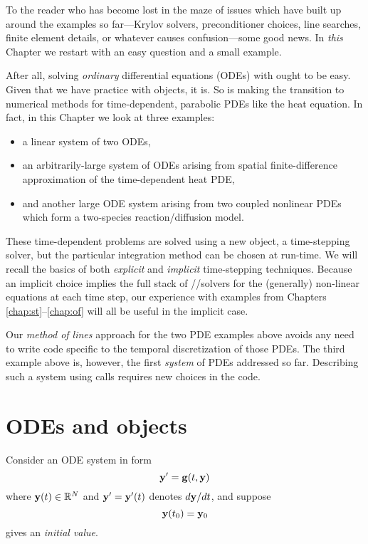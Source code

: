 
To the reader who has become lost in the maze of issues which have built up around the examples so far---Krylov solvers, preconditioner choices, line searches, finite element details, or whatever causes confusion---some good news.  In \emph{this} Chapter we restart with an easy question and a small example.

After all, solving \emph{ordinary} differential equations (ODEs) with \PETSc ought to be easy.  Given that we have practice with \PETSc objects, it is.  So is making the transition to numerical methods for time-dependent, parabolic PDEs like the heat equation.  In fact, in this Chapter we look at three examples:
\begin{itemize}
\item a linear system of two ODEs,
\item an arbitrarily-large system of ODEs arising from spatial finite-difference approximation of the time-dependent heat PDE,
\item and another large ODE system arising from two coupled nonlinear PDEs which form a two-species reaction/diffusion model.
\end{itemize}

These time-dependent problems are solved using a new \PETSc object, a \pTS time-stepping solver, but the particular integration method can be chosen at run-time.  We will recall the basics of both \emph{explicit} and \emph{implicit} time-stepping techniques.  Because an implicit choice implies the full stack of \pSNES/\pKSP/\pPC solvers for the (generally) non-linear equations at each time step, our experience with examples from Chapters \ref{chap:st}--\ref{chap:of} will all be useful in the implicit case.

Our \emph{method of lines} approach for the two PDE examples above avoids any need to write code specific to the temporal discretization of those PDEs.  The third example above is, however, the first \emph{system} of PDEs addressed so far.  Describing such a system using \PETSc calls requires new choices in the code.


\section{ODEs and \PETSc \pTS objects}

Consider an ODE system in form
\begin{equation}
\mathbf{y}' = \mathbf{g}(t,\mathbf{y})  \label{eq:ts:ode}
\end{equation}
where $\mathbf{y}(t) \in \mathbb{R}^N$ and $\mathbf{y}'=\mathbf{y}'(t)$ denotes $d\mathbf{y}/dt$, and suppose
\begin{equation}
\mathbf{y}(t_0) = \mathbf{y}_0  \label{eq:ts:ode:iv}
\end{equation}
gives an \emph{initial value}.

